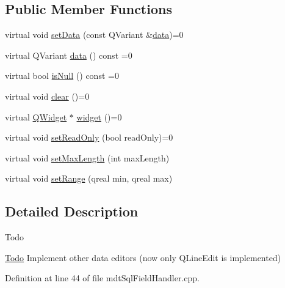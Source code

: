 \subsection*{Public Member Functions}
\begin{DoxyCompactItemize}
\item 
virtual void \hyperlink{classmdt_sql_field_handler_abstract_data_widget_a5d9e6c6bfa923f07598179c71c88ba4b}{set\-Data} (const Q\-Variant \&\hyperlink{classmdt_sql_field_handler_abstract_data_widget_a90f1259501179fc28cd46bdf9c5f7d55}{data})=0
\item 
virtual Q\-Variant \hyperlink{classmdt_sql_field_handler_abstract_data_widget_a90f1259501179fc28cd46bdf9c5f7d55}{data} () const =0
\item 
virtual bool \hyperlink{classmdt_sql_field_handler_abstract_data_widget_a077d5b1b9a0cb592be9def99cdc6ad3a}{is\-Null} () const =0
\item 
virtual void \hyperlink{classmdt_sql_field_handler_abstract_data_widget_a54c1bc177f2a5f06d29ce24a801b6b3e}{clear} ()=0
\item 
virtual \hyperlink{class_q_widget}{Q\-Widget} $\ast$ \hyperlink{classmdt_sql_field_handler_abstract_data_widget_a460c76d650eba635ffb42951c7adbb50}{widget} ()=0
\item 
virtual void \hyperlink{classmdt_sql_field_handler_abstract_data_widget_a5d358ea305c375309c83be572dae2562}{set\-Read\-Only} (bool read\-Only)=0
\item 
virtual void \hyperlink{classmdt_sql_field_handler_abstract_data_widget_a7167463d910f13cff681668b4bc0e139}{set\-Max\-Length} (int max\-Length)
\item 
virtual void \hyperlink{classmdt_sql_field_handler_abstract_data_widget_a1c391f7af13f1a451354273352934801}{set\-Range} (qreal min, qreal max)
\end{DoxyCompactItemize}


\subsection{Detailed Description}
\begin{DoxyRefDesc}{Todo}
\item[\hyperlink{todo__todo000077}{Todo}]Implement other data editors (now only Q\-Line\-Edit is implemented) \end{DoxyRefDesc}


Definition at line 44 of file mdt\-Sql\-Field\-Handler.\-cpp.



